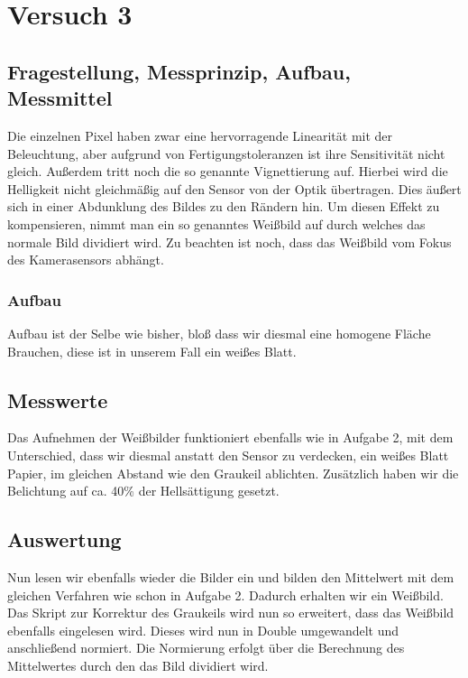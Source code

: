 \documentclass[TGAI_Laborbericht.tex]{subfiles}
\begin{document}
\chapter{Versuch 3}
\label{chap:VERSUCH_3}

\section{Fragestellung, Messprinzip, Aufbau, Messmittel}
\label{chap:VERSUCH_3_FRAGESTELLUNG}
Die einzelnen Pixel haben zwar eine hervorragende Linearität mit der Beleuchtung, aber aufgrund von Fertigungstoleranzen ist ihre Sensitivität nicht gleich. Außerdem tritt noch die so genannte Vignettierung auf. Hierbei wird die Helligkeit nicht gleichmäßig auf den Sensor von der Optik übertragen. Dies äußert sich in einer Abdunklung des Bildes zu den Rändern hin. Um diesen Effekt zu kompensieren, nimmt man ein so genanntes Weißbild auf durch welches das normale Bild dividiert wird. Zu beachten ist noch, dass das Weißbild vom Fokus des Kamerasensors abhängt.

\subsection{Aufbau}

Aufbau ist der Selbe wie bisher, bloß dass wir diesmal eine homogene Fläche Brauchen, diese ist in unserem Fall ein weißes Blatt.

\section{Messwerte}
\label{chap:VERSUCH_3_MESSWERTE}

Das Aufnehmen der Weißbilder funktioniert ebenfalls wie in Aufgabe 2, mit dem Unterschied, dass wir diesmal anstatt den Sensor zu verdecken, ein weißes Blatt Papier, im gleichen Abstand wie den Graukeil ablichten. Zusätzlich haben wir die Belichtung auf ca. 40\% der Hellsättigung gesetzt.

\section{Auswertung}
\label{chap:VERSUCH_3_AUSWERTUNG}

Nun lesen wir ebenfalls wieder die Bilder ein und bilden den Mittelwert mit dem gleichen Verfahren wie schon in Aufgabe 2. Dadurch erhalten wir ein Weißbild. Das Skript zur Korrektur des Graukeils wird nun so erweitert, dass das Weißbild ebenfalls eingelesen wird. Dieses wird nun in Double umgewandelt und anschließend normiert. Die Normierung erfolgt über die Berechnung des Mittelwertes durch den das Bild dividiert wird.
\end{document}
